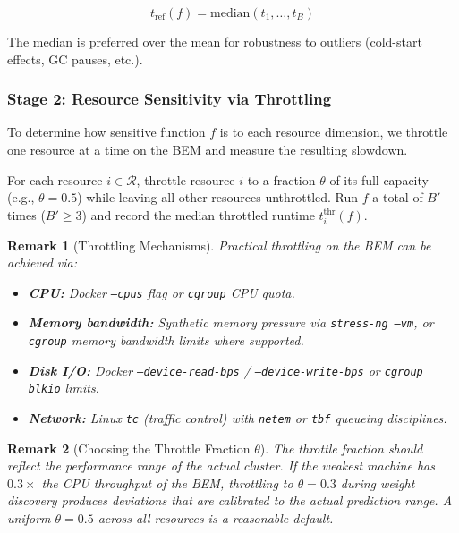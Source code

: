 \documentclass[11pt, a4paper]{article}
\newtheorem{remark}{Remark}
\begin{document}
\begin{equation}
\label{eq:tref}
    t_{\mathrm{ref}}(f) = \mathrm{median}(t_1, \ldots, t_B)
\end{equation}

The median is preferred over the mean for robustness to outliers (cold-start
effects, GC pauses, etc.).

\subsubsection{Stage 2: Resource Sensitivity via Throttling}
\label{sec:throttling}

To determine how sensitive function $f$ is to each resource dimension, we
throttle one resource at a time on the BEM and measure the resulting slowdown.

For each resource $i \in \mathcal{R}$, throttle resource $i$ to a fraction
$\theta$ of its full capacity (e.g., $\theta = 0.5$) while leaving all other
resources unthrottled. Run $f$ a total of $B'$ times ($B' \geq 3$) and
record the median throttled runtime $t_i^{\mathrm{thr}}(f)$.

\begin{remark}[Throttling Mechanisms]
Practical throttling on the BEM can be achieved via:
\begin{itemize}
    \item \textbf{CPU:} Docker \texttt{--cpus} flag or \texttt{cgroup} CPU quota.
    \item \textbf{Memory bandwidth:} Synthetic memory pressure via
          \texttt{stress-ng --vm}, or \texttt{cgroup} memory bandwidth limits
          where supported.
    \item \textbf{Disk I/O:} Docker \texttt{--device-read-bps} /
          \texttt{--device-write-bps} or \texttt{cgroup} \texttt{blkio} limits.
    \item \textbf{Network:} Linux \texttt{tc} (traffic control) with
          \texttt{netem} or \texttt{tbf} queueing disciplines.
\end{itemize}
\end{remark}

\begin{remark}[Choosing the Throttle Fraction $\theta$]
\label{rem:theta}
The throttle fraction should reflect the performance range of the actual
cluster. If the weakest machine has $0.3\times$ the CPU throughput of the BEM,
throttling to $\theta = 0.3$ during weight discovery produces deviations that
are calibrated to the actual prediction range. A uniform $\theta = 0.5$ across
all resources is a reasonable default.
\end{remark}
\end{document}
